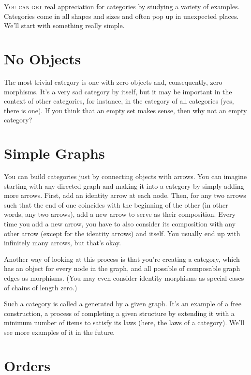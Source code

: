 
\lettrine[lhang=0.17]{Y}{ou can get} real appreciation for categories by studying a variety of
examples. Categories come in all shapes and sizes and often pop up in
unexpected places. We'll start with something really simple.

\section{No Objects}

The most trivial category is one with zero objects and, consequently,
zero morphisms. It's a very sad category by itself, but it may be
important in the context of other categories, for instance, in the
category of all categories (yes, there is one). If you think that an
empty set makes sense, then why not an empty category?

\section{Simple Graphs}

You can build categories just by connecting objects with arrows. You can
imagine starting with any directed graph and making it into a category
by simply adding more arrows. First, add an identity arrow at each node.
Then, for any two arrows such that the end of one coincides with the
beginning of the other (in other words, any two 
arrows), add a new arrow to serve as their composition. Every time you
add a new arrow, you have to also consider its composition with any
other arrow (except for the identity arrows) and itself. You usually end
up with infinitely many arrows, but that's okay.

Another way of looking at this process is that you're creating a
category, which has an object for every node in the graph, and all
possible  of composable graph edges as morphisms. (You may
even consider identity morphisms as special cases of chains of length
zero.)

Such a category is called a  generated by a given
graph. It's an example of a free construction, a process of completing a
given structure by extending it with a minimum number of items to
satisfy its laws (here, the laws of a category). We'll see more examples
of it in the future.

\section{Orders}

